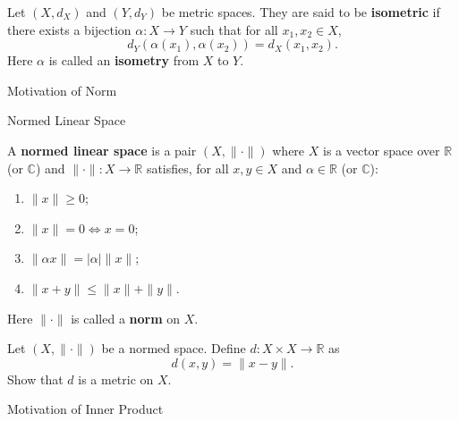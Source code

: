 \documentclass[12pt, a4paper]{article}
\begin{document}
\vspace{10pt}

\begin{definition}
    Let $(X,d_X)$ and $(Y,d_Y)$ be metric spaces. They are said to be
    \textbf{isometric} if there exists a bijection $\alpha:X\to Y$ such that for
    all $x_1,x_2\in X$,
    \[
        d_Y(\alpha(x_1),\alpha(x_2))=d_X(x_1,x_2).
    \]
    Here $\alpha$ is called an \textbf{isometry} from $X$ to $Y$.
\end{definition}

\clearpage

\begin{heading}
    Motivation of Norm
\end{heading}

\clearpage

\begin{heading}
    Normed Linear Space
\end{heading}

\vspace{10pt}

\begin{definition}
    A \textbf{normed linear space} is a pair $(X,\|\cdot\|)$ where $X$ is a vector space
    over $\mathbb{R}$ (or $\mathbb{C}$) and
    $\|\cdot\|:X\to\mathbb{R}$ satisfies, for all $x,y\in X$ and $\alpha\in\mathbb{R}$
    (or $\mathbb{C}$):
    \begin{enumerate}[label=(N\arabic*)]
    \item $\|x\|\ge 0$;
    \item $\|x\|=0 \iff x=0$;
    \item $\|\alpha x\|=|\alpha|\|x\|$;
    \item $\|x+y\|\le \|x\|+\|y\|$.
    \end{enumerate}
    Here $\|\cdot\|$ is called a \textbf{norm} on $X$.
\end{definition}

\clearpage

\begin{theorem}
    Let $(X,\|\cdot\|)$ be a normed space. Define $d:X\times X\to\mathbb{R}$ as
    \[
        d(x,y)=\|x-y\|.
    \]
    Show that $d$ is a metric on $X$.
\end{theorem}

\clearpage

\begin{heading}
    Motivation of Inner Product
\end{heading}
\end{document}
